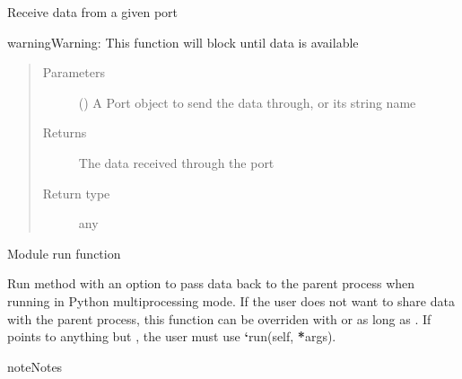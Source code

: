\documentclass[letterpaper,10pt,openany,oneside,english]{sphinxmanual}
\begin{document}
\begin{fulllineitems}
\begin{fulllineitems}
\label{\detokenize{src_rst/module:module.Module.recv}}
Receive data from a given port

\begin{sphinxadmonition}{warning}{Warning:}
This function will block until data is available
\end{sphinxadmonition}
\begin{quote}\begin{description}
\item[{Parameters}] \leavevmode
{} ({\hyperref[\detokenize{src_rst/port:port.Port}]{}}\sphinxstyleliteralemphasis{\sphinxupquote{, }}) \textendash{} A Port object to send the data through, or its string name

\item[{Returns}] \leavevmode
{} \textendash{} The data received through the port

\item[{Return type}] \leavevmode
any

\end{description}\end{quote}

\end{fulllineitems}


\begin{fulllineitems}
\label{\detokenize{src_rst/module:module.Module.run}}
Module run function

Run method with an option to pass data back to the parent process when running
in Python multiprocessing mode. If the user does not want to share data with
the parent process, this function can be overriden with 
or  as long as .
If  points to anything but , the user must use
{\color{red}\bfseries{}{}`}run(self, {\color{red}\bfseries{}*}args).

\begin{sphinxadmonition}{note}{Notes}


\end{sphinxadmonition}
\end{fulllineitems}
\end{fulllineitems}
\end{document}
